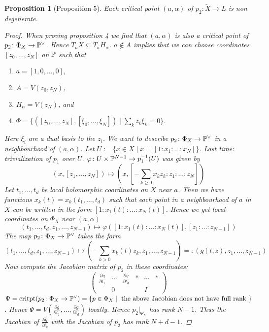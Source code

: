\documentclass[A4paper, british, reqno]{amsart}
\theoremstyle{darkgreentheorem}
\newtheorem{prop}[thm]{Proposition}
\theoremstyle{darkbluedefinition}
\theoremstyle{darkredexample}
\theoremstyle{remark}
\newcommand{\1}{\mathbbm{1}}
\newcommand{\dual}{^{\vee}}
\newcommand{\sub}{\subseteq}
\begin{document}
\begin{prop}[Proposition 5]
    Each critical point $(a,\alpha)$ of $p_{2}\colon \tilde{X}\to L$ is non degenerate.
    \begin{proof}
	When proving proposition 4 we find that $(a,\alpha)$ is also a critical point of $p_{2}\colon \Phi_{X}\to \P\dual$.
	Hence $T_{a}X\sub T_{a}H_{\alpha}$.
	$a\not\in A$ implies that we can choose coordinates $[z_{0},\ldots,z_{N}]$ on $\P$ such that
	\begin{enumerate}
	    \item $a=[1,0,\ldots,0]$,
	    \item $A=V(z_{0},z_{N})$,
	    \item $H_{\alpha}=V(z_{N})$, and
	    \item $\Phi=\{ ([z_{0},\ldots,z_{N}],[\xi_{0},\ldots,\xi_{N}])\mid \sum_{k}z_{k}\xi_{k}=0\}$.
	\end{enumerate}
	Here $\xi_{i}$ are a dual basis to the $z_{i}$.
	We want to describe $p_{2}\colon \Phi_{X}\to \P\dual$ in a neighbourhood of $(a,\alpha)$.
	Let $U:=\{x\in X\mid x=[1:x_{1}:\ldots:x_{N}]\}$.
	Last time: trivialization of $p_{1}$ over $U$.
	$\varphi\colon U\times \P^{N-1}\to p_{1}^{-1}(U)$ was given by
	\[ (x,[z_{1},\ldots,z_{N}])\mapsto (x,[-\sum_{k\geqslant 0}x_{k}z_{k}:z_{1}:\ldots:z_{N}]) \]
	Let $t_{1},\ldots,t_{d}$ be local holomorphic coordinates on $X$ near $a$.
	Then we have functions $x_{k}(t)=x_{k}(t_{1},\ldots,t_{d})$ such that each point in a neighbourhood of $a$ in $X$ can be written in the form $[1:x_{1}(t):\ldots:x_{N}(t)]$.
	Hence we get local coordinates on $\Phi_{X}$ near $(a,\alpha)$
	\[ (t_{1},\ldots,t_{d},z_{1},\ldots,z_{N-1})\mapsto \varphi([1:x_{1}(t):\ldots:x_{N}(t)],[z_{1}:\ldots:z_{N-1}]) \]
	The map $p_{2}\colon \Phi_{X}\to \P\dual$ takes the form
	\[ (t_{1},\ldots,t_{d},z_{1},\ldots,z_{N-1})\mapsto (-\sum_{k>0} x_{k}(t)z_{k},z_{1},\ldots,z_{N-1})=:(g(t,z),z_{1},\ldots,z_{N-1}) \]
	Now compute the Jacobian matrix of $p_{2}$ in these coordinates:
	\[ \begin{pmatrix} \frac{\partial g}{\partial t_{1}} & \cdots & \frac{\partial g}{\partial t_{d}} & * & \cdots & * \\ & 0 & & & I & \end{pmatrix} \]
	$\Psi=\operatorname{critpt}(p_{2}\colon \Phi_{X}\to \P\dual)=\{ p\in \Phi_{X}\mid \text{ the above Jacobian does not have full rank }\}$.
	Hence $\Psi=V(\frac{\partial g}{\partial t_{1}},\ldots,\frac{\partial g}{\partial t_{d}})$ locally.
	Hence $p_{2}|_{\Psi_{X}}$ has rank $N-1$.
	Thus the Jacobian of $\frac{\partial g}{\partial t_{k}}$ with the Jacobian of $p_{2}$ has rank $N+d-1$.

\end{proof}
\end{prop}
\end{document}
